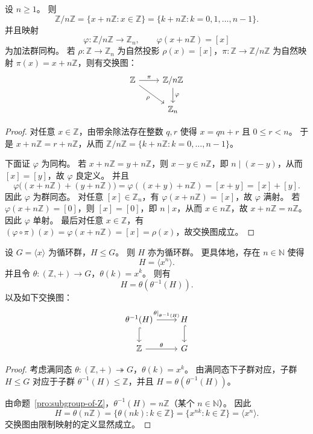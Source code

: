 \documentclass[lang=cn,a4paper,newtx]{elegantbook}
\begin{document}
\begin{proposition}
设 $n\ge 1$。
则
\[
  \mathbb{Z}/n\mathbb{Z}=\{x+n\mathbb{Z}:x\in \mathbb{Z}\}=\{k+n\mathbb{Z}:k=0,1,\dots,n-1\}.
\]
并且映射
\[
  \varphi:\mathbb{Z}/n\mathbb{Z}\to \mathbb{Z}_n,\qquad \varphi(x+n\mathbb{Z})=[x]
\]
为加法群同构。
若 $\rho:\mathbb{Z}\to \mathbb{Z}_n$ 为自然投影 $\rho(x)=[x]$，$\pi:\mathbb{Z}\to \mathbb{Z}/n\mathbb{Z}$ 为自然映射 $\pi(x)=x+n\mathbb{Z}$，则有交换图：
\[
\begin{tikzcd}
 \mathbb{Z} \arrow[r,"\pi"] \arrow[dr,"\rho"'] & \mathbb{Z}/n\mathbb{Z} \arrow[d,"\varphi"] \\
 & \mathbb{Z}_n
\end{tikzcd}
\]
\end{proposition}

\begin{proof}
对任意 $x\in \mathbb{Z}$，由带余除法存在整数 $q,r$ 使得 $x=qn+r$ 且 $0\le r<n$。
于是 $x+n\mathbb{Z}=r+n\mathbb{Z}$，从而 $\mathbb{Z}/n\mathbb{Z}=\{k+n\mathbb{Z}:k=0,\dots,n-1\}$。

下面证 $\varphi$ 为同构。
若 $x+n\mathbb{Z}=y+n\mathbb{Z}$，则 $x-y\in n\mathbb{Z}$，即 $n\mid (x-y)$，从而 $[x]=[y]$，故 $\varphi$ 良定义。
并且
\[
  \varphi\bigl((x+n\mathbb{Z})+(y+n\mathbb{Z})\bigr)=\varphi((x+y)+n\mathbb{Z})=[x+y]=[x]+[y].
\]
因此 $\varphi$ 为群同态。
对任意 $[x]\in \mathbb{Z}_n$，有 $\varphi(x+n\mathbb{Z})=[x]$，故 $\varphi$ 满射。
若 $\varphi(x+n\mathbb{Z})=[0]$，则 $[x]=[0]$，即 $n\mid x$，从而 $x\in n\mathbb{Z}$，故 $x+n\mathbb{Z}=n\mathbb{Z}$。
因此 $\varphi$ 单射。
最后对任意 $x\in \mathbb{Z}$，有 $(\varphi\circ\pi)(x)=\varphi(x+n\mathbb{Z})=[x]=\rho(x)$，故交换图成立。
\end{proof}

\begin{proposition}
设 $G=\langle x\rangle$ 为循环群，$H\le G$。
则 $H$ 亦为循环群。
更具体地，存在 $n\in \mathbb{N}$ 使得
\[
  H=\langle x^n\rangle.
\]
并且令 $\theta:(\mathbb{Z},+)\to G$，$\theta(k)=x^k$。
则有
\[
  H=\theta(\theta^{-1}(H)).
\]
以及如下交换图：
\[
\begin{tikzcd}
 \theta^{-1}(H) \arrow[r,"\theta|_{\theta^{-1}(H)}"] \arrow[d,hook] & H \arrow[d,hook] \\
 \mathbb{Z} \arrow[r,"\theta"] & G
\end{tikzcd}
\]
\end{proposition}

\begin{proof}
考虑满同态 $\theta:(\mathbb{Z},+)\twoheadrightarrow G$，$\theta(k)=x^k$。
由满同态下子群对应，子群 $H\le G$ 对应于子群 $\theta^{-1}(H)\le \mathbb{Z}$，并且 $H=\theta(\theta^{-1}(H))$。

由命题~\ref{pro:subgroup-of-Z}，$\theta^{-1}(H)=n\mathbb{Z}$（某个 $n\in \mathbb{N}$）。
因此
\[
  H=\theta(n\mathbb{Z})=\{\theta(nk):k\in \mathbb{Z}\}=\{x^{nk}:k\in \mathbb{Z}\}=\langle x^n\rangle.
\]
交换图由限制映射的定义显然成立。
\end{proof}
\end{document}
